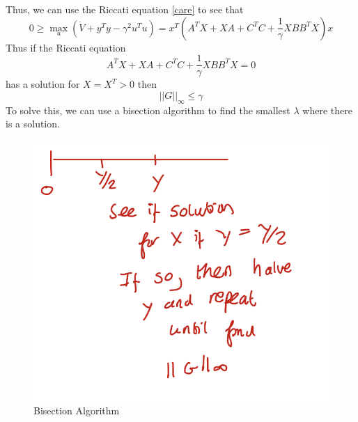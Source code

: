 \documentclass{article}
\begin{document}
Thus, we can use the Riccati equation \eqref{care} to see that
\[
0 \geq \max_u(\dot V + y^Ty - \gamma^2 u^Tu) = x^T(A^T X + XA + C^TC + \frac{1}{\gamma} XBB^TX)x
\]
Thus if the Riccati equation
\[
A^T X + XA + C^TC + \frac{1}{\gamma} XBB^TX = 0
\]
has a solution for $X = X^T > 0$ then
\[
||G||_\infty \leq \gamma
\]
To solve this, we can use a bisection algorithm to find the smallest $\lambda$ where there is a solution. 
\begin{figure}
    \centering
    \includegraphics[width = 0.3\linewidth]{Screenshot 2023-02-09 at 15.38.03.png}
    \caption{Bisection Algorithm}
\end{figure}
\end{document}

